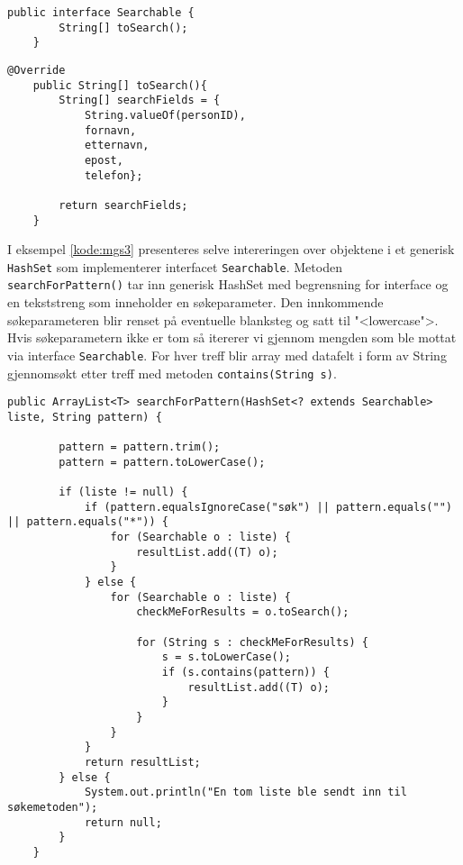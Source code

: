\begin{lstlisting}[caption=Oversikt over \texttt{Searchable} interface, label=kode:mgs1]
	public interface Searchable {
   		String[] toSearch();
	}
\end{lstlisting}

\begin{lstlisting}[caption={[\texttt{toSearch()}]Implemntasjon av metode \texttt{toSearch()} i klassen \texttt{Person.java}}, label=kode:mgs2]
	@Override
    public String[] toSearch(){
        String[] searchFields = {
            String.valueOf(personID), 
            fornavn, 
            etternavn, 
            epost, 
            telefon};
        
        return searchFields;
    }
\end{lstlisting}

I eksempel \ref{kode:mgs3} presenteres selve intereringen over objektene i et generisk \texttt{HashSet} som implementerer interfacet \texttt{Searchable}. Metoden \texttt{searchForPattern()} tar inn generisk HashSet med begrensning for interface og en tekststreng som inneholder en søkeparameter. Den innkommende søkeparameteren blir renset på eventuelle blanksteg og satt til "<lowercase">. Hvis søkeparametern ikke er tom så itererer vi gjennom mengden som ble mottat via interface \texttt{Searchable}. For hver treff blir array med datafelt i form av String gjennomsøkt etter treff med metoden \texttt{contains(String s)}. 

\begin{lstlisting}[caption={[Iterasjon med \texttt{Searchable}]Iterasjon over generisk \texttt{HashSet} som implementerer interface \texttt{Searchable}}, label=kode:mgs3]
    public ArrayList<T> searchForPattern(HashSet<? extends Searchable> liste, String pattern) {

        pattern = pattern.trim();
        pattern = pattern.toLowerCase();

        if (liste != null) {
            if (pattern.equalsIgnoreCase("søk") || pattern.equals("") || pattern.equals("*")) {
                for (Searchable o : liste) {
                    resultList.add((T) o);
                }
            } else {
                for (Searchable o : liste) {
                    checkMeForResults = o.toSearch();

                    for (String s : checkMeForResults) {
                        s = s.toLowerCase();
                        if (s.contains(pattern)) {
                            resultList.add((T) o);
                        }
                    }
                }
            }
            return resultList;
        } else {
            System.out.println("En tom liste ble sendt inn til søkemetoden");
            return null;
        }
    }
\end{lstlisting}


